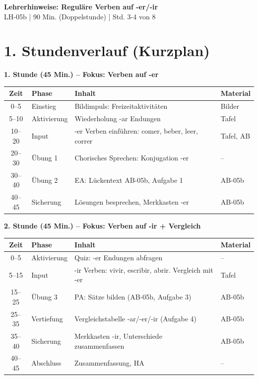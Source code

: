 \documentclass[11pt, a4paper]{article}
\newcommand{\fachfarbe}{spanisch}
\newcommand{\thema}{Reguläre Verben auf -er/-ir}
\newcommand{\sequenz}{05}
\newcommand{\block}{b}
\newcommand{\dauer}{90 Min. (Doppelstunde)}
\begin{document}
\begin{center}
    {\Large\bfseries\textcolor{\fachfarbe}{Lehrerhinweise: \thema}}\\[0.3em]
    {\normalsize LH-\sequenz\block{} | \dauer{} | Std. 3-4 von 8}
\end{center}

\vspace{10pt}


\section*{1. Stundenverlauf (Kurzplan)}

\textbf{1. Stunde (45 Min.) -- Fokus: Verben auf -er}

\begin{tabularx}{\textwidth}{|c|l|X|l|}
\hline
\textbf{Zeit} & \textbf{Phase} & \textbf{Inhalt} & \textbf{Material} \\
\hline
0--5 & Einstieg & Bildimpuls: Freizeitaktivitäten & Bilder \\
\hline
5--10 & Aktivierung & Wiederholung -ar Endungen & Tafel \\
\hline
10--20 & Input & -er Verben einführen: comer, beber, leer, correr & Tafel, AB \\
\hline
20--30 & Übung 1 & Chorisches Sprechen: Konjugation -er & -- \\
\hline
30--40 & Übung 2 & EA: Lückentext AB-05b, Aufgabe 1 & AB-05b \\
\hline
40--45 & Sicherung & Lösungen besprechen, Merkkasten -er & AB-05b \\
\hline
\end{tabularx}

\vspace{1em}

\textbf{2. Stunde (45 Min.) -- Fokus: Verben auf -ir + Vergleich}

\begin{tabularx}{\textwidth}{|c|l|X|l|}
\hline
\textbf{Zeit} & \textbf{Phase} & \textbf{Inhalt} & \textbf{Material} \\
\hline
0--5 & Aktivierung & Quiz: -er Endungen abfragen & -- \\
\hline
5--15 & Input & -ir Verben: vivir, escribir, abrir. Vergleich mit -er & Tafel \\
\hline
15--25 & Übung 3 & PA: Sätze bilden (AB-05b, Aufgabe 3) & AB-05b \\
\hline
25--35 & Vertiefung & Vergleichstabelle -ar/-er/-ir (Aufgabe 4) & AB-05b \\
\hline
35--40 & Sicherung & Merkkasten -ir, Unterschiede zusammenfassen & AB-05b \\
\hline
40--45 & Abschluss & Zusammenfassung, HA & -- \\
\hline
\end{tabularx}
\end{document}
